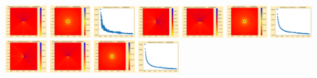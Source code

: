 \documentclass[11pt]{article}
\begin{document}
\includegraphics[width=0.11875\textwidth]{frame0095fig3.png}
\vskip 10pt 
\includegraphics[width=0.11875\textwidth]{frame0096fig0.png}
\includegraphics[width=0.11875\textwidth]{frame0096fig1.png}
\includegraphics[width=0.11875\textwidth]{frame0096fig2.png}
\includegraphics[width=0.11875\textwidth]{frame0096fig3.png}
\includegraphics[width=0.11875\textwidth]{frame0097fig0.png}
\includegraphics[width=0.11875\textwidth]{frame0097fig1.png}
\includegraphics[width=0.11875\textwidth]{frame0097fig2.png}
\includegraphics[width=0.11875\textwidth]{frame0097fig3.png}
\vskip 10pt 
\includegraphics[width=0.11875\textwidth]{frame0098fig0.png}
\includegraphics[width=0.11875\textwidth]{frame0098fig1.png}
\end{document}
